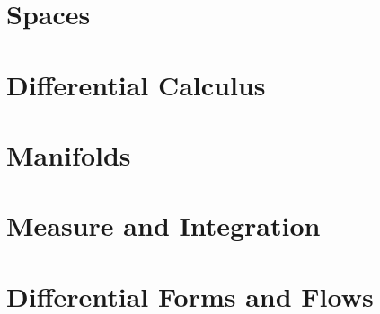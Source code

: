 
\part{Spaces}






\part{Differential Calculus}







\part{Manifolds}





\part{Measure and Integration}






\part{Differential Forms and Flows}






